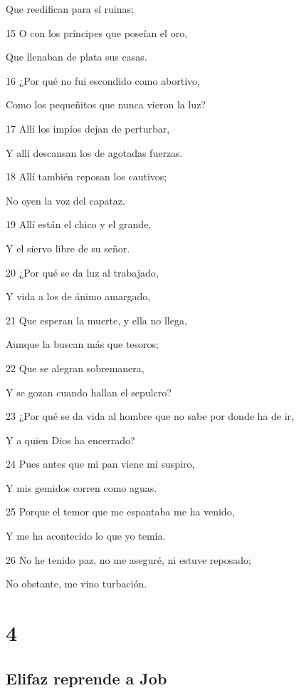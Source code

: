 \par Que reedifican para sí ruinas;
\par 15 O con los príncipes que poseían el oro,
\par Que llenaban de plata sus casas.
\par 16 ¿Por qué no fui escondido como abortivo,
\par Como los pequeñitos que nunca vieron la luz?
\par 17 Allí los impíos dejan de perturbar,
\par Y allí descansan los de agotadas fuerzas.
\par 18 Allí también reposan los cautivos;
\par No oyen la voz del capataz.
\par 19 Allí están el chico y el grande,
\par Y el siervo libre de su señor. 
\par 20 ¿Por qué se da luz al trabajado,
\par Y vida a los de ánimo amargado,
\par 21 Que esperan la muerte, y ella no llega, 
\par Aunque la buscan más que tesoros; 
\par 22 Que se alegran sobremanera,
\par Y se gozan cuando hallan el sepulcro?
\par 23 ¿Por qué se da vida al hombre que no sabe por donde ha de ir,
\par Y a quien Dios ha encerrado?
\par 24 Pues antes que mi pan viene mi suspiro,
\par Y mis gemidos corren como aguas.
\par 25 Porque el temor que me espantaba me ha venido,
\par Y me ha acontecido lo que yo temía.
\par 26 No he tenido paz, no me aseguré, ni estuve reposado;
\par No obstante, me vino turbación.

\chapter{4}

\section*{Elifaz reprende a Job}


